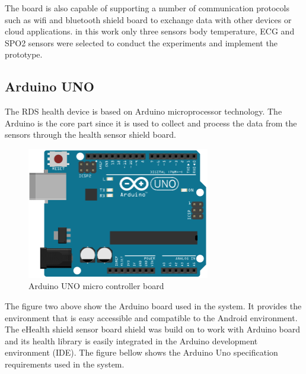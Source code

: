 The board is also capable of supporting a number of communication protocols such as wifi and bluetooth shield board to exchange data with other devices or cloud applications. in this work only three sensors body temperature, ECG and SPO2 sensors were selected to conduct the experiments and implement the prototype.

\subsection{Arduino UNO}

The RDS health device is based on Arduino microprocessor technology. The Arduino is the core part since it is used to collect and process the data from the sensors through the health sensor shield board.

\begin{figure}[H]
\centering
\includegraphics[width=8cm]{images/arduino-uno.png} %
\caption{Arduino UNO micro controller board}
\label{fig:fig-eg}
\end{figure}

The figure two above show the Arduino board used in the system. It provides the environment that is easy accessible and compatible to the Android environment. The eHealth shield sensor board shield was build on to work with Arduino board and its health library is easily integrated in the Arduino development environment (IDE). The figure bellow shows the Arduino Uno specification requirements used in the system.

